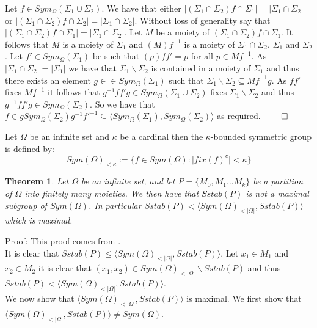 \documentclass{report}
\newtheorem{theorem}{Theorem}[section]
\newenvironment{defn}[1][]{\refstepcounter{theorem}\begin{trivlist}
\item[\hskip \labelsep {\bfseries Definition  \thetheorem  \, \def\temp{#1}\ifx\temp\empty  #1\else  (#1)\fi
}]}   {\end{trivlist}}
\begin{document}
Let $f \in Sym_{\Omega}(\Sigma_1 \cup \Sigma_2)$. We have that either $\vert (\Sigma_1 \cap \Sigma_2)f \cap \Sigma_1 \vert = \vert \Sigma_1 \cap \Sigma_2 \vert$ or $\vert (\Sigma_1 \cap \Sigma_2)f \cap \Sigma_2 \vert = \vert \Sigma_1 \cap \Sigma_2 \vert$. Without loss of generality say that $\vert (\Sigma_1 \cap \Sigma_2)f \cap \Sigma_1 \vert = \vert \Sigma_1 \cap \Sigma_2 \vert$. Let $M$ be a moiety of $(\Sigma_1 \cap \Sigma_2)f \cap \Sigma_1$. It follows that $M$ is a moiety of $\Sigma_1$ and $(M)f^{-1}$ is a moiety of $\Sigma_1 \cap \Sigma_2$, $\Sigma_1$ and $\Sigma_2$. Let $f' \in Sym_{\Omega}(\Sigma_1)$ be such that $(p)ff'=p$ for all $p \in Mf^{-1}$. As $\vert \Sigma_1 \cap \Sigma_2 \vert = \vert \Sigma_1 \vert$ we have that $\Sigma_1 \backslash \Sigma_2$ is contained in a moiety of $\Sigma_1$ and thus there exists an element $g\in \in Sym_{\Omega}(\Sigma_1)$ such that $\Sigma_1 \backslash \Sigma_2 \subseteq Mf^{-1}g$. As $ff'$ fixes $Mf^{-1}$ it follows that $g^{-1}ff'g \in Sym_{\Omega}(\Sigma_1 \cup \Sigma_2) $ fixes $\Sigma_1 \backslash \Sigma_2$ and thus $g^{-1}ff'g \in Sym_{\Omega}(\Sigma_2) $. So we have that $f \in g Sym_{\Omega}(\Sigma_2)g^{-1}f'^{-1} \subseteq \langle Sym_{\Omega}(\Sigma_1) ,Sym_{\Omega}( \Sigma_2)  \rangle$ as required. $\qed$
\begin{defn}
Let $\Omega$ be an infinite set and $\kappa$ be a cardinal then the $\kappa$-bounded symmetric group is defined by:
\[Sym(\Omega)_{<\kappa}:=\{f \in Sym(\Omega): \vert fix(f)^c \vert < \kappa\}\]
\end{defn}
\begin{theorem}\label{moistab}
Let $\Omega$ be an infinite set, and let $P=\{M_0,M_1 \ldots M_k\}$ be a partition of $\Omega$ into finitely many moieties. We then have that $Sstab(P)$ is not a maximal subgroup of $Sym(\Omega)$. In particular $Sstab(P)< \langle Sym(\Omega)_{<\vert \Omega \vert},Sstab(P)\rangle$ which is maximal.
\end{theorem}\par
Proof: This proof comes from \cite{ultrafiltermax}.\\
It is clear that $Sstab(P) \leq \langle Sym(\Omega)_{<\vert \Omega \vert},Sstab(P)\rangle$. Let $x_1 \in M_1$ and $x_2 \in M_2$ it is clear that $(x_1, x_2) \in Sym(\Omega)_{<\vert \Omega \vert}\backslash Sstab(P)$ and thus $Sstab(P) < \langle Sym(\Omega)_{<\vert \Omega \vert},Sstab(P)\rangle$.\\
We now show that $\langle Sym(\Omega)_{<\vert \Omega \vert},Sstab(P)\rangle$ is maximal. We first show that $\langle Sym(\Omega)_{<\vert \Omega \vert},Sstab(P)\rangle \neq Sym(\Omega)$.
\end{document}
